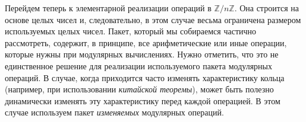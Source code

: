 \documentclass{../../template/mai_book}
\begin{document}

    Перейдем теперь к элементарной реализации операций в $\mathbb{Z}/n\mathbb{Z}$. Она строится на основе целых чисел
    и, следовательно, в этом случае весьма ограничена размером используемых целых чисел. Пакет, который мы собираемся частично рассмотреть, содержит, в
    принципе, все арифметические или иные операции, которые нужны при модулярных вычислениях.
    Нужно отметить, что это не единственное решение для реализации используемого пакета модулярных операций. В случае, когда приходится
    часто изменять характеристику кольца (например, при использовании \textit {китайской теоремы}), может быть полезно динамически изменять эту
    характеристику перед каждой операцией. В этом случае используем пакет \textit {изменяемых} модулярных операций.
\end{document}
